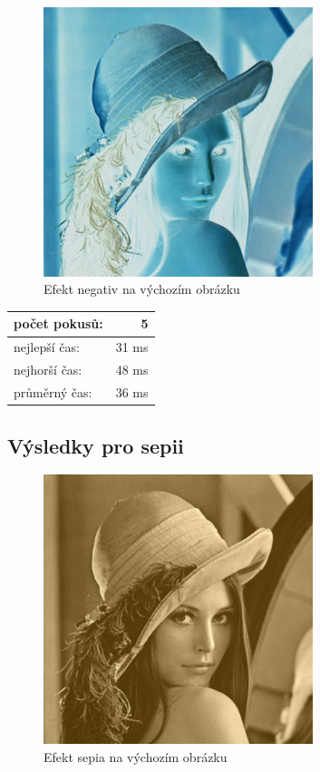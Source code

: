 \documentclass[12pt]{scrartcl}
\begin{document}
\begin{figure}[!ht]
	\centering
	\label{obr:negativ}
	\includegraphics[width=0.7\textwidth,natwidth=1,natheight=1]{negative.pdf}
	\caption{Efekt negativ na výchozím obrázku}
\end{figure}	

\begin{center}
  \begin{tabular}{ | l | r | }
    \hline
    počet pokusů: & 5 \\ \hline
    nejlepší čas: & 31 ms \\ \hline
    nejhorší čas: & 48 ms \\ \hline
    průměrný čas: & 36 ms \\
    \hline
  \end{tabular}
\end{center}

\newpage
\subsection{Výsledky pro sepii}

\begin{figure}[!ht]
	\centering
	\label{obr:sepia}
	\includegraphics[width=0.7\textwidth,natwidth=1,natheight=1]{sepia.pdf}
	\caption{Efekt sepia na výchozím obrázku}
\end{figure}	
\end{document}
